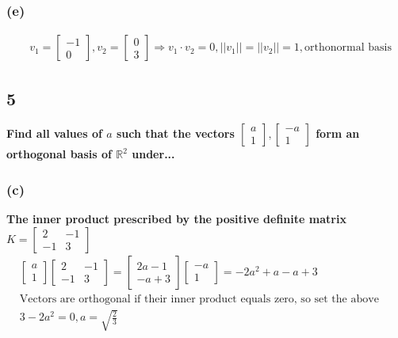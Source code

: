 \documentclass[10pt,letterpaper]{article}
\begin{document}
	\subsubsection*{(e)}
	\begin{align*}
	& v_1 = \begin{bmatrix}
	-1 \\ 0
	\end{bmatrix}, v_2 = \begin{bmatrix}
	0 \\ 3 
	\end{bmatrix} \Rightarrow v_1 \cdot v_2 = 0, ||v_1|| = ||v_2|| = 1, \boxed{\text{orthonormal basis}}
	\end{align*}
	\subsection*{5} \textbf{Find all values of $a$ such that the vectors $\begin{bmatrix}
		a \\ 1
		\end{bmatrix}, \begin{bmatrix}
		-a \\ 1
		\end{bmatrix}$ form an orthogonal basis of $\mathbb{R}^2$ under... }
	\subsubsection*{(c)} \textbf{The inner product prescribed by the positive definite matrix $K = \begin{bmatrix}
		2 & -1 \\ -1 & 3
		\end{bmatrix}$}
		\begin{align*}
		& \begin{bmatrix}
		a \\ 1
		\end{bmatrix} \begin{bmatrix}
		2 & -1 \\ -1 & 3
		\end{bmatrix} = \begin{bmatrix}
		2a - 1 \\ -a + 3
		\end{bmatrix} \begin{bmatrix}
		-a \\ 1
		\end{bmatrix} = -2a^2 + a - a + 3 \\
		& \text{Vectors are orthogonal if their inner product equals zero, so set the above result equal to 0:} \\ 
		& 3 - 2a^2 = 0, \boxed{a = \sqrt{\frac{2}{3}}}
		\end{align*}
\end{document}

